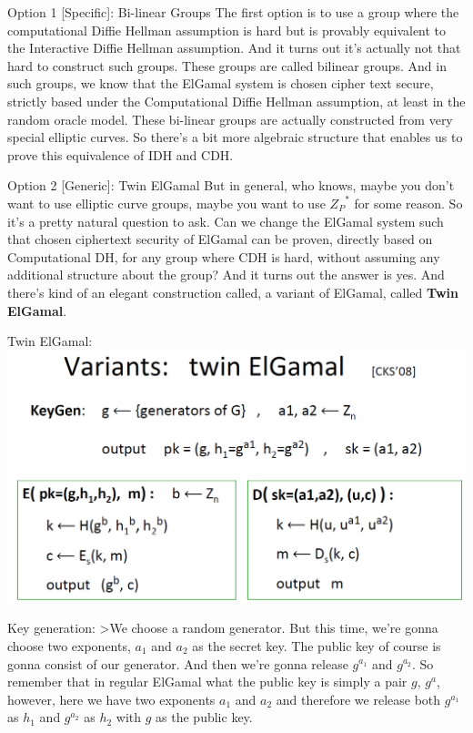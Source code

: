 \documentclass[11pt]{article}
\makeatletter
\def\maxwidth{\ifdim\Gin@nat@width>\linewidth\linewidth
    \else\Gin@nat@width\fi}
\let\Oldincludegraphics\includegraphics
\renewcommand{\includegraphics}[1]{\Oldincludegraphics[width=.8\maxwidth]{#1}}
\makeatother
\begin{document}
Option 1 {[}Specific{]}: Bi-linear Groups The first option is to use a
group where the computational Diffie Hellman assumption is hard but is
provably equivalent to the Interactive Diffie Hellman assumption. And it
turns out it's actually not that hard to construct such groups. These
groups are called bilinear groups. And in such groups, we know that the
ElGamal system is chosen cipher text secure, strictly based under the
Computational Diffie Hellman assumption, at least in the random oracle
model. These bi-linear groups are actually constructed from very special
elliptic curves. So there's a bit more algebraic structure that enables
us to prove this equivalence of IDH and CDH.

Option 2 {[}Generic{]}: Twin ElGamal But in general, who knows, maybe
you don't want to use elliptic curve groups, maybe you want to use
\({Z_P}^{*}\) for some reason. So it's a pretty natural question to ask.
Can we change the ElGamal system such that chosen ciphertext security of
ElGamal can be proven, directly based on Computational DH, for any group
where CDH is hard, without assuming any additional structure about the
group? And it turns out the answer is yes. And there's kind of an
elegant construction called, a variant of ElGamal, called \textbf{Twin
ElGamal}.

Twin ElGamal: \includegraphics{./Images/TwinElGamal.png}

Key generation: \textgreater{}We choose a random generator. But this
time, we're gonna choose two exponents, \(a_1\) and \(a_2\) as the
secret key. The public key of course is gonna consist of our generator.
And then we're gonna release \(g^{a_1}\) and \(g^{a_2}\). So remember
that in regular ElGamal what the public key is simply a pair \(g\),
\(g^{a}\), however, here we have two exponents \(a_1\) and \(a_2\) and
therefore we release both \(g^{a_1}\) as \(h_1\) and \(g^{a_2}\) as
\(h_2\) with \(g\) as the public key.
\end{document}
